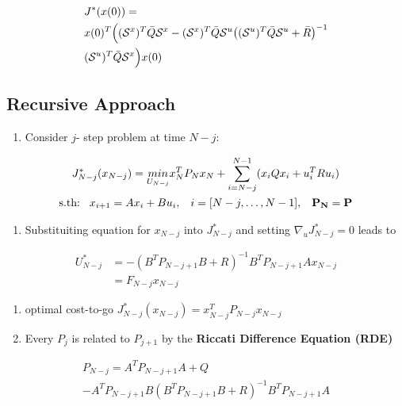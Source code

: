 \begin{align*}
    &J^*(x(0)) = \\ &x(0)^T \Big( (\mathcal{S}^x)^T\Bar{Q}\mathcal{S}^x-(\mathcal{S}^x)^T\Bar{Q}\mathcal{S}^u\big((\mathcal{S}^u)^T\Bar{Q}\mathcal{S}^u+\Bar{R}\big)^{-1}\\ &(\mathcal{S}^u)^T\Bar{Q}\mathcal{S}^x\Big)x(0)
    \end{align*}
\vfill\null\columnbreak
\subsection{Recursive Approach}
    \begin{enumerate}
        \item Consider $j$- step problem at time $N-j$:
    \end{enumerate}    
        \begin{gather*}
        J_{N-j}^*(x_{N-j}) = \underset{U_{N-j}}{min}x^T_NP_Nx_N + \sum^{N-1}_{i=N-j}(x_iQx_i+u_i^TRu_i)\\
        \textrm{s.th:\hspace{3mm}} x_{i+1} =Ax_i+Bu_i, \hspace{3mm}i = [N-j, \dots, N-1 ],\hspace{3mm} \mathbf{P_N = P} \end{gather*}
    \begin{enumerate}[resume]
        \item Substituiting equation for $x_{N-j}$ into $J^*_{N-j}$ and setting $\nabla_uJ^*_{N-j} = 0$ leads to
        \end{enumerate}
        \begin{align*}U^*_{N-j} &= -(B^TP_{N-j+1}B+R)^{-1}B^TP_{N-j+1}Ax_{N-j}\\&=F_{N-j}x_{N-j}\end{align*}
        \begin{enumerate}[resume]
        \item optimal cost-to-go $J^*_{N-j}(x_{N-j})=x_{N-j}^TP_{N-j}x_{N-j}$
        \item Every $P_j$ is related to $P_{j+1}$ by the \textbf{Riccati Difference Equation (RDE)}
    \end{enumerate}
       \begin{gather*}P_{N-j}=A^TP_{N-j+1}A + Q \\- A^TP_{N-j+1}B(B^TP_{N-j+1}B+R)^{-1} B^TP_{N-j+1} A\end{gather*}

